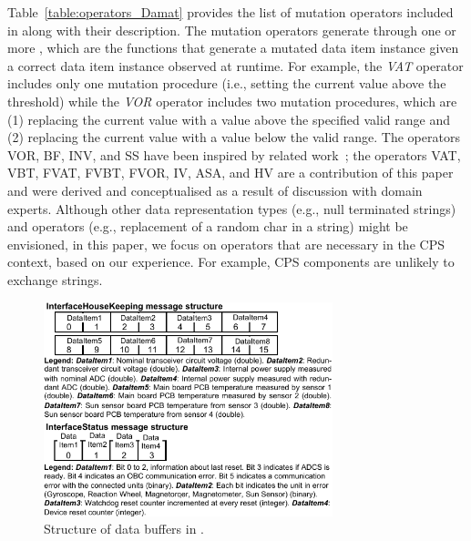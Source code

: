 Table~\ref{table:operators_Damat} provides the list of mutation operators included in \APPR along with their description. The \APPR mutation operators generate  through one or more , which are the functions that generate a mutated data item instance given a correct data item instance observed at runtime. For example, the \emph{VAT} operator includes only one mutation procedure (i.e., setting the current value above the threshold) while the \emph{VOR} operator includes two mutation procedures, which are
(1) replacing the current value with a value above the specified valid range and (2) replacing the current value with a value below the valid range.
The operators VOR, BF, INV, and SS have been inspired by related work~\cite{di2015generating,PeachFuzzer,Matinnejad19}; the operators VAT, VBT, FVAT, FVBT, FVOR, IV, ASA,  and HV
are a contribution of this paper and were derived and conceptualised as a result of discussion with domain experts.
Although other data representation types (e.g., null terminated strings) and operators (e.g., replacement of a random char in a string) might be envisioned, in this paper, we focus on operators that are necessary in the CPS context, based on our experience.
For example, CPS components are unlikely to exchange strings.

\begin{figure}
	\centering
		\includegraphics[width=8.4cm]{damat/images/BufferStructuresSmall}
		\caption{Structure of data buffers in \ESAIL.}
		\label{fig:appr:bufferStructure}
	\end{figure}
	
	

\clearpage


